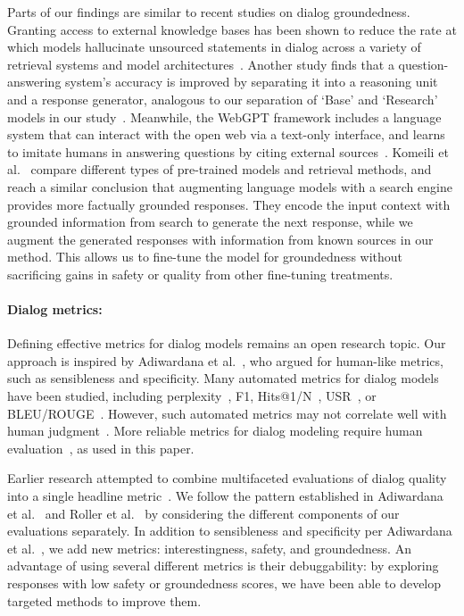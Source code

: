 Parts of our findings are similar to recent studies on dialog groundedness. Granting access to external knowledge bases has been shown to reduce the rate at which models hallucinate unsourced statements in dialog across a variety of retrieval systems and model architectures~\cite{shuster2021retrieval}. Another study finds that a question-answering system's accuracy is improved by separating it into a reasoning unit and a response generator, analogous to our separation of `Base' and `Research' models in our study~\cite{adolphs2021reason}. Meanwhile, the WebGPT framework includes a language system that can interact with the open web via a text-only interface, and learns to imitate humans in answering questions by citing external sources~\cite{nakano2021webgpt}. Komeili et al.~\cite{komeili2021internetaugmented} compare different types of pre-trained models and retrieval methods, and reach a similar conclusion that augmenting language models with a search engine provides more factually grounded responses. They encode the input context with grounded information from search to generate the next response, while we augment the generated responses with information from known sources in our method. This allows us to fine-tune the model for groundedness without sacrificing gains in safety or quality from other fine-tuning treatments.

\paragraph{Dialog metrics:} Defining effective metrics for dialog models remains an open research topic. Our approach is inspired by Adiwardana et al.~\cite{adiwardana2020humanlike}, who argued for human-like metrics, such as sensibleness and specificity. Many automated metrics for dialog models have been studied, including perplexity~\cite{NCM,adiwardana2020humanlike}, F1, Hits@1/N~\cite{dinan2020}, USR~\cite{mehri2020usr}, or BLEU/ROUGE~\cite{Papineni02bleu,sordoni2015neural,li2015diversity}. However, such automated metrics may not correlate well with human judgment~\cite{liu-etal-2016-evaluate}. More reliable metrics for dialog modeling require human evaluation~\cite{see-etal-2019-makes,li2019,blenderbot,dinan2020,adiwardana2020humanlike,nedelchev2020treating}, as used in this paper.

Earlier research attempted to combine multifaceted evaluations of dialog quality into a single headline metric~\cite{amazoneval}. We follow the pattern established in Adiwardana et al.~\cite{adiwardana2020humanlike} and Roller et al.~\cite{blenderbot} by considering the different components of our evaluations separately. In addition to sensibleness and specificity per Adiwardana et al.~\cite{adiwardana2020humanlike}, we add new metrics: interestingness, safety, and groundedness. An advantage of using several different metrics is their debuggability: by exploring responses with low safety or groundedness scores, we have been able to develop targeted methods to improve them.


